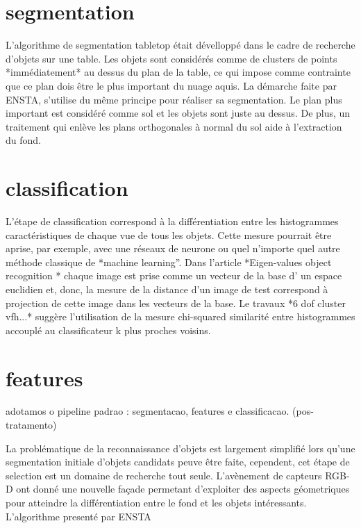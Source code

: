 \section{segmentation}

L’algorithme de segmentation tabletop était dévelloppé dans le cadre de recherche d’objets sur une table. Les objets sont considérés comme de clusters de points *immédiatement* au dessus du plan de la table, ce qui impose comme contrainte que ce plan dois être le plus important du nuage aquis.
La démarche faite par ENSTA, s'utilise du même principe pour réaliser sa segmentation. Le plan plus important est considéré comme sol et les objets sont juste au dessus. De plus, un traitement qui enlève les plans orthogonales à normal du sol aide à l'extraction du fond.


\section{classification}

L'étape de classification correspond à la différentiation entre les histogrammes caractéristiques de chaque vue de tous les objets. Cette mesure pourrait être aprise, par exemple, avec une réseaux de neurone ou quel n'importe quel autre méthode classique de *machine learning''. Dans l'article *Eigen-values object recognition * chaque image est prise comme un vecteur de la base d' un espace euclidien et, donc, la mesure de la distance d'un image de test correspond à projection de cette image dans les vecteurs de la base. Le travaux *6 dof cluster vfh...* suggère l'utilisation de la mesure chi-squared similarité entre histogrammes accouplé au classificateur k plus proches voisins.

\section{features}

adotamos o pipeline padrao :  segmentacao, features e classificacao. (pos-tratamento)

La problématique de la reconnaissance d'objets est largement simplifié lors qu'une segmentation initiale d'objets candidats peuve être faite, cependent, cet étape de selection est un domaine de recherche tout seule. L'avènement de capteurs RGB-D ont donné une nouvelle façade permetant d'exploiter des aspects géometriques pour atteindre la différentiation entre le fond et les objets intéressants. L'algorithme presenté par {\color{blue} ENSTA}

